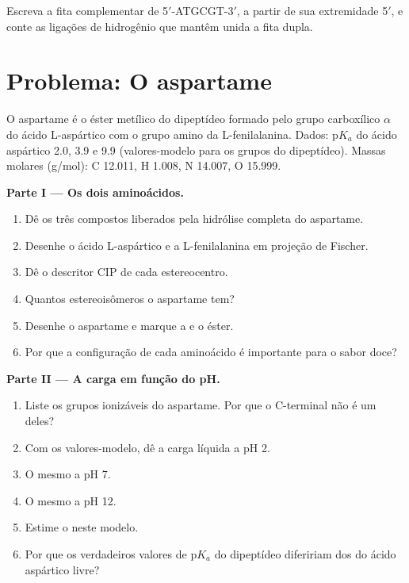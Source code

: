 \begin{exercise}[$\star\star\star$]\label{exo:b2:biomolecules:12}
Escreva a fita complementar de 5$'$-ATGCGT-3$'$, a partir de sua extremidade 5$'$, e conte as ligações
de hidrogênio que mantêm unida a fita dupla.
\end{exercise}

\section{Problema: O aspartame}

\begin{problem}
\label{pb:b2:biomolecules:1}
O aspartame é o éster metílico do dipeptídeo formado pelo grupo carboxílico $\alpha$ do ácido
L-aspártico com o grupo amino da L-fenilalanina. Dados: $\mathrm pK_a$ do ácido aspártico 2.0, 3.9 e 9.9
(valores-modelo para os grupos do dipeptídeo). Massas molares (\unit{g/mol}): C 12.011, H 1.008,
N 14.007, O 15.999.

\medskip
\noindent\textbf{Parte I --- Os dois aminoácidos.}
\begin{enumerate}
  \item Dê os três compostos liberados pela hidrólise completa do aspartame.
  \item Desenhe o ácido L-aspártico e a L-fenilalanina em projeção de Fischer.
  \item Dê o descritor CIP de cada estereocentro.
  \item Quantos estereoisômeros o aspartame tem?
  \item Desenhe o aspartame e marque a  e o éster.
  \item Por que a configuração de cada aminoácido é importante para o sabor doce?
\end{enumerate}

\medskip
\noindent\textbf{Parte II --- A carga em função do pH.}
\begin{enumerate}[resume]
  \item Liste os grupos ionizáveis do aspartame. Por que o C-terminal não é um deles?
  \item Com os valores-modelo, dê a carga líquida a pH 2.
  \item O mesmo a pH 7.
  \item O mesmo a pH 12.
  \item Estime o  neste modelo.
  \item Por que os verdadeiros valores de $\mathrm pK_a$ do dipeptídeo difeririam dos do ácido aspártico
        livre?
\end{enumerate}


\end{problem}
